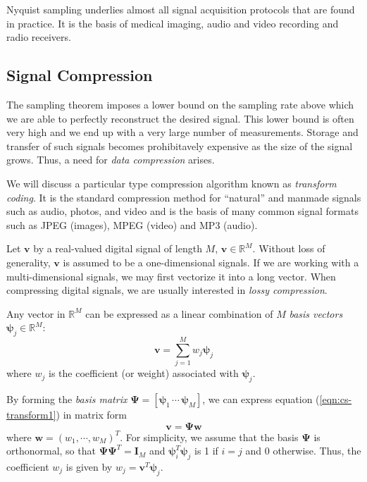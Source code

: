 Nyquist sampling underlies almost all signal acquisition protocols that are found in practice. 
It is the basis of medical imaging, audio and video recording and radio receivers.

\subsection{Signal Compression}
\label{sect:compression}
The sampling theorem imposes a lower bound on the sampling rate above which we are able to perfectly reconstruct the desired signal.
This lower bound is often very high and we end up with a very large number of measurements.
Storage and transfer of such signals becomes prohibitavely expensive as the size of the signal grows.
Thus, a need for \emph{data compression} arises.

We will discuss a particular type compression algorithm known as \emph{transform coding}.
It is the standard compression method for ``natural'' and manmade signals such as audio, photos, and video and is the basis of many common signal formats such as JPEG (images), MPEG (video) and MP3 (audio).

Let $\bm v$ by a real-valued digital signal of length $M$, $\bm v \in \mathbb{R}^M$.
Without loss of generality, $\bm v$ is assumed to be a one-dimensional signals.
If we are working with a multi-dimensional signals, we may first vectorize it into a long vector.
When compressing digital signals, we are usually interested in \emph{lossy compression}.

Any vector in $\mathbb{R}^M$ can be expressed as a linear combination of $M$ \emph{basis vectors} $\bm\psi_j \in \mathbb{R}^M$:
\begin{equation}
\label{eqn:cs-transform1}
  \bm v = \sum_{j=1}^M w_j \bm\psi_j
\end{equation}
where $w_j$ is the coefficient (or weight) associated with $\bm\psi_j$.

By forming the \emph{basis matrix} $\bm\Psi = \left[\bm\psi_1 \,\cdots\, \bm\psi_M\right]$, we can express equation (\ref{eqn:cs-transform1}) in matrix form
\begin{equation*}
\bm v = \bm\Psi \bm w
\end{equation*}
where $\bm w = (w_1,\cdots,w_M)^T$.
For simplicity, we assume that the basis $\bm\Psi$ is orthonormal, so that $\bm\Psi\bm\Psi^T = \bm I_M$ and $\bm\psi_i^T\bm\psi_j$ is 1 if $i = j$ and 0 otherwise.
Thus, the coefficient $w_j$ is given by $w_j = \bm v^T\bm\psi_j$.

